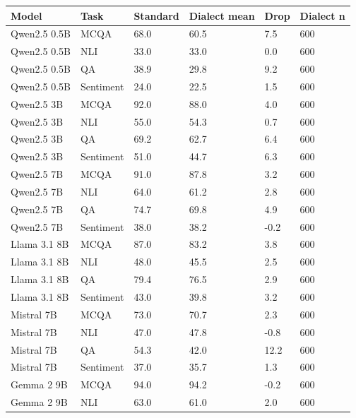 \begin{tabular}{llllll}
\toprule
       Model &      Task & Standard & Dialect mean & Drop & Dialect n \\
\midrule
Qwen2.5 0.5B &      MCQA &     68.0 &         60.5 &  7.5 &       600 \\
Qwen2.5 0.5B &       NLI &     33.0 &         33.0 &  0.0 &       600 \\
Qwen2.5 0.5B &        QA &     38.9 &         29.8 &  9.2 &       600 \\
Qwen2.5 0.5B & Sentiment &     24.0 &         22.5 &  1.5 &       600 \\
  Qwen2.5 3B &      MCQA &     92.0 &         88.0 &  4.0 &       600 \\
  Qwen2.5 3B &       NLI &     55.0 &         54.3 &  0.7 &       600 \\
  Qwen2.5 3B &        QA &     69.2 &         62.7 &  6.4 &       600 \\
  Qwen2.5 3B & Sentiment &     51.0 &         44.7 &  6.3 &       600 \\
  Qwen2.5 7B &      MCQA &     91.0 &         87.8 &  3.2 &       600 \\
  Qwen2.5 7B &       NLI &     64.0 &         61.2 &  2.8 &       600 \\
  Qwen2.5 7B &        QA &     74.7 &         69.8 &  4.9 &       600 \\
  Qwen2.5 7B & Sentiment &     38.0 &         38.2 & -0.2 &       600 \\
Llama 3.1 8B &      MCQA &     87.0 &         83.2 &  3.8 &       600 \\
Llama 3.1 8B &       NLI &     48.0 &         45.5 &  2.5 &       600 \\
Llama 3.1 8B &        QA &     79.4 &         76.5 &  2.9 &       600 \\
Llama 3.1 8B & Sentiment &     43.0 &         39.8 &  3.2 &       600 \\
  Mistral 7B &      MCQA &     73.0 &         70.7 &  2.3 &       600 \\
  Mistral 7B &       NLI &     47.0 &         47.8 & -0.8 &       600 \\
  Mistral 7B &        QA &     54.3 &         42.0 & 12.2 &       600 \\
  Mistral 7B & Sentiment &     37.0 &         35.7 &  1.3 &       600 \\
  Gemma 2 9B &      MCQA &     94.0 &         94.2 & -0.2 &       600 \\
  Gemma 2 9B &       NLI &     63.0 &         61.0 &  2.0 &       600 \\

\end{tabular}
